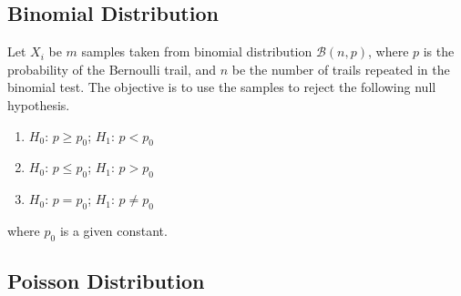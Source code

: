 \subsection{Binomial Distribution}

Let $X_i$ be $m$ samples taken from binomial distribution $\mathcal{B}(n,p)$, where $p$ is the probability of the Bernoulli trail, and $n$ be the number of trails repeated in the binomial test. The objective is to use the samples to reject the following null hypothesis.
\begin{enumerate}
	\item $H_0$: $p \geq p_0$; $H_1$: $p < p_0$
	\item $H_0$: $p \leq p_0$; $H_1$: $p > p_0$
	\item $H_0$: $p = p_0$; $H_1$: $p \neq p_0$
\end{enumerate}
where $p_0$ is a given constant.

\subsection{Poisson Distribution} 
